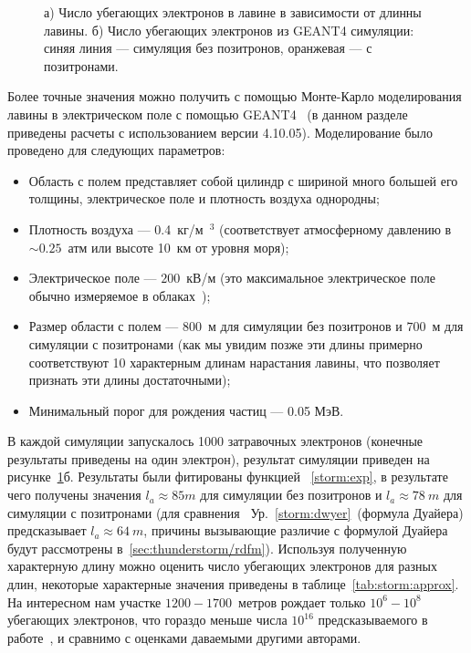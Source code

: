 \begin{figure}[t]
    \begin{center}
        \begin{minipage}[h]{0.49\linewidth}
        \end{minipage}
        \hfill
        \begin{minipage}[h]{0.49\linewidth}
        \end{minipage}
        \caption{  а) Число убегающих электронов в лавине в зависимости от длинны лавины. б) Число убегающих электронов из GEANT4 симуляции: синяя линия --- симуляция без позитронов, оранжевая --- с позитронами.}
    \end{center}
    \label{storm:number_runway}
\end{figure}
Более точные значения можно получить с помощью Монте-Карло моделирования лавины в электрическом поле с помощью GEANT4~\cite{Geant2003,Geant2006, Geant2016} (в данном разделе приведены расчеты с использованием версии 4.10.05).
Моделирование было проведено для следующих параметров: 
\begin{itemize}
    \item Область с полем представляет собой  цилиндр с шириной много большей его толщины, электрическое поле и плотность воздуха однородны;
    \item Плотность воздуха --- 0.4~кг/м~$^3$ (соответствует атмосферному давлению в  $\sim 0.25$~атм или высоте 10~км от уровня моря);
    \item Электрическое поле --- $200$~кВ/м (это максимальное электрическое поле обычно измеряемое в облаках~\cite{rakov_uman});
    \item Размер области с полем --- $800$~м для симуляции без позитронов и $700$~м для симуляции с позитронами (как мы увидим позже эти длины примерно соответствуют 10 характерным длинам нарастания лавины, что позволяет признать эти длины достаточными);
    \item Минимальный порог для рождения частиц --- 0.05 МэВ.
\end{itemize}
В каждой симуляции запускалось 1000 затравочных электронов (конечные результаты приведены на один электрон), результат симуляции приведен на рисунке~\ref{storm:number_runway}б. Результаты были фитированы функцией ~\ref{storm:exp}, в результате чего получены значения  $l_a \approx 85 m$ для симуляции без позитронов и $l_a \approx 78~m$ для симуляции с позитронами (для сравнения ~Ур.~\ref{storm:dwyer}~(формула Дуайера) предсказывает $l_a \approx 64~m$, причины вызывающие различие с формулой Дуайера будут рассмотрены в~\ref{sec:thunderstorm/rdfm}). Используя полученную характерную длину можно оценить число убегающих электронов для разных длин, некоторые характерные значения приведены в таблице~\ref{tab:storm:approx}. На интересном нам участке $1200 - 1700$~метров рождает только $10^6-10^8$ убегающих электронов, что гораздо меньше числа $10^{16}$ предсказываемого в работе~\cite{Oreshkin_2018}, и сравнимо с оценками даваемыми другими авторами.
